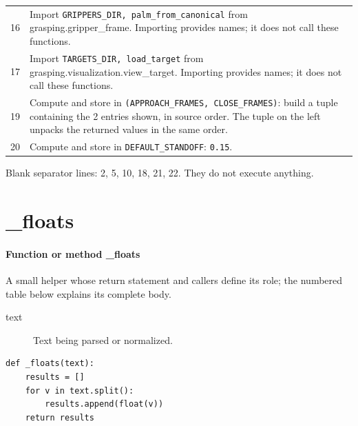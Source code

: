 \documentclass[11pt,a4paper]{book}
\begin{document}
\begin{longtable}{r p{}}
16 & Import \texttt{GRIPPERS\_DIR, palm\_from\_canonical} from grasping.gripper\_frame. Importing provides names; it does not call these functions. \\

17 & Import \texttt{TARGETS\_DIR, load\_target} from grasping.visualization.view\_target. Importing provides names; it does not call these functions. \\

19 & Compute and store in \texttt{(APPROACH\_FRAMES, CLOSE\_FRAMES)}: build a tuple containing the 2 entries shown, in source order. The tuple on the left unpacks the returned values in the same order. \\

20 & Compute and store in \texttt{DEFAULT\_STANDOFF}: \texttt{0.15}.  \\

\end{longtable}

Blank separator lines: 2, 5, 10, 18, 21, 22. They do not execute anything.

\section{\_floats}

\paragraph{Function or method \_floats}
A small helper whose return statement and callers define its role; the numbered table below explains its complete body.

\begin{description}
\item[text] Text being parsed or normalized.
\end{description}

\begin{lstlisting}[firstnumber=23]
def _floats(text):
    results = []
    for v in text.split():
        results.append(float(v))
    return results


\end{lstlisting}
\end{document}
